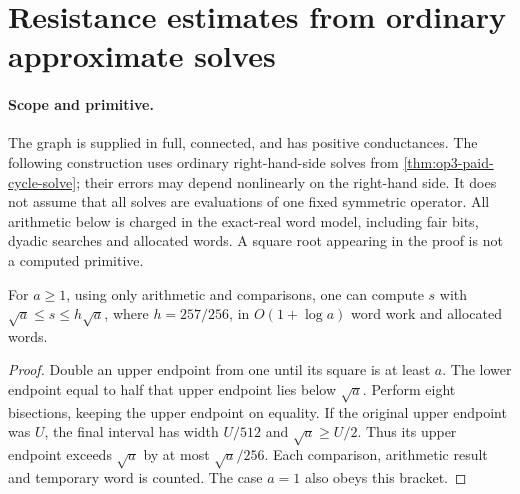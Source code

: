 \section{Resistance estimates from ordinary approximate solves}
\label{sec:op3-ordinary-solve-resistances}

\paragraph{Scope and primitive.}
The graph is supplied in full, connected, and has positive conductances.
The following construction uses ordinary right-hand-side solves from
\cref{thm:op3-paid-cycle-solve}; their errors may depend nonlinearly on
the right-hand side. It does not assume that all solves are evaluations
of one fixed symmetric operator. All arithmetic below is charged in the
exact-real word model, including fair bits, dyadic searches and allocated
words. A square root appearing in the proof is not a computed primitive.

\begin{lemma}
\label{lem:op3-paid-square-root-bracket}
For $a\geq1$, using only arithmetic and comparisons, one can compute $s$
with $\sqrt a\leq s\leq h\sqrt a$, where $h=257/256$, in
$O(1+\log a)$ word work and allocated words.
\end{lemma}
\begin{proof}
Double an upper endpoint from one until its square is at least $a$.
The lower endpoint equal to half that upper endpoint lies below $\sqrt a$.
Perform eight bisections, keeping the upper endpoint on equality.
If the original upper endpoint was $U$, the final interval has width
$U/512$ and $\sqrt a\geq U/2$. Thus its upper endpoint exceeds
$\sqrt a$ by at most $\sqrt a/256$. Each comparison, arithmetic result
and temporary word is counted. The case $a=1$ also obeys this bracket.
\end{proof}

